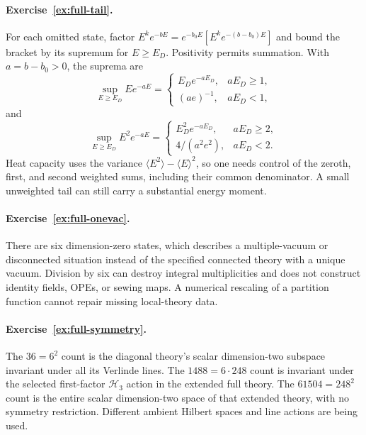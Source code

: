 \paragraph{Exercise~\ref{ex:full-tail}.}
\label{sol:ex:full-tail}
For each omitted state, factor
$E^ke^{-bE}=e^{-b_0E}[E^ke^{-(b-b_0)E}]$
and bound the bracket by its supremum for $E\ge E_D$.
Positivity permits summation. With $a=b-b_0>0$, the
suprema are
\[
 \sup_{E\ge E_D}Ee^{-aE}=
 \begin{cases}E_De^{-aE_D},&aE_D\ge1,\\
 (ae)^{-1},&aE_D<1,\end{cases}
\]
and
\[
 \sup_{E\ge E_D}E^2e^{-aE}=
 \begin{cases}E_D^2e^{-aE_D},&aE_D\ge2,\\
 4/(a^2e^2),&aE_D<2.\end{cases}
\]
Heat capacity uses the variance
$\langle E^2\rangle-\langle E\rangle^2$, so one needs
control of the zeroth, first, and second weighted sums,
including their common denominator. A small unweighted
tail can still carry a substantial energy moment.



\paragraph{Exercise~\ref{ex:full-onevac}.}
\label{sol:ex:full-onevac}
There are six dimension-zero states, which describes a
multiple-vacuum or disconnected situation instead of the
specified connected theory with a unique vacuum.
Division by six can destroy integral multiplicities and
does not construct identity fields, OPEs, or sewing maps.
A numerical rescaling of a partition function cannot repair
missing local-theory data.



\paragraph{Exercise~\ref{ex:full-symmetry}.}
\label{sol:ex:full-symmetry}
The $36=6^2$ count is the diagonal theory's scalar
dimension-two subspace invariant under all its Verlinde lines.
The $1488=6\cdot248$ count is invariant under the selected
first-factor $\mathcal H_3$ action in the extended full theory.
The $61504=248^2$ count is the entire scalar dimension-two
space of that extended theory, with no symmetry restriction.
Different ambient Hilbert spaces and line actions are being used.

